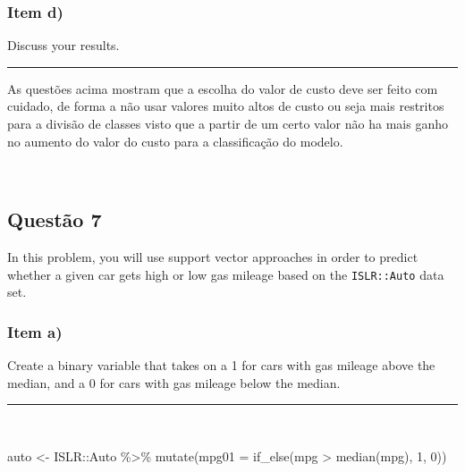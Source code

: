 \documentclass[
  a4paperpaper,
]{article}
\newenvironment{Shaded}{\begin{snugshade}}{\end{snugshade}}
\newcommand{\AttributeTok}[1]{\textcolor[rgb]{0.40,0.45,0.13}{#1}}
\newcommand{\DecValTok}[1]{\textcolor[rgb]{0.68,0.00,0.00}{#1}}
\newcommand{\FunctionTok}[1]{\textcolor[rgb]{0.28,0.35,0.67}{#1}}
\newcommand{\NormalTok}[1]{\textcolor[rgb]{0.00,0.23,0.31}{#1}}
\newcommand{\OtherTok}[1]{\textcolor[rgb]{0.00,0.23,0.31}{#1}}
\newcommand{\SpecialCharTok}[1]{\textcolor[rgb]{0.37,0.37,0.37}{#1}}
\begin{document}
\subsubsection{Item d)}\label{item-d-2}

Discuss your results.

\begin{center}\rule{0.5\linewidth}{0.5pt}\end{center}

As questões acima mostram que a escolha do valor de custo deve ser feito
com cuidado, de forma a não usar valores muito altos de custo ou seja
mais restritos para a divisão de classes visto que a partir de um certo
valor não ha mais ganho no aumento do valor do custo para a
classificação do modelo.

~

\subsection{Questão 7}\label{questuxe3o-7}

In this problem, you will use support vector approaches in order to
predict whether a given car gets high or low gas mileage based on the
\texttt{ISLR::Auto} data set.

\subsubsection{Item a)}\label{item-a-4}

Create a binary variable that takes on a 1 for cars with gas mileage
above the median, and a 0 for cars with gas mileage below the median.

\begin{center}\rule{0.5\linewidth}{0.5pt}\end{center}

~

\begin{Shaded}
\begin{Highlighting}[]
\NormalTok{auto }\OtherTok{\textless{}{-}}\NormalTok{ ISLR}\SpecialCharTok{::}\NormalTok{Auto }\SpecialCharTok{\%\textgreater{}\%}
  \FunctionTok{mutate}\NormalTok{(}\AttributeTok{mpg01 =} \FunctionTok{if\_else}\NormalTok{(mpg }\SpecialCharTok{\textgreater{}} \FunctionTok{median}\NormalTok{(mpg), }\DecValTok{1}\NormalTok{, }\DecValTok{0}\NormalTok{))}
\end{Highlighting}
\end{Shaded}

~
\end{document}
